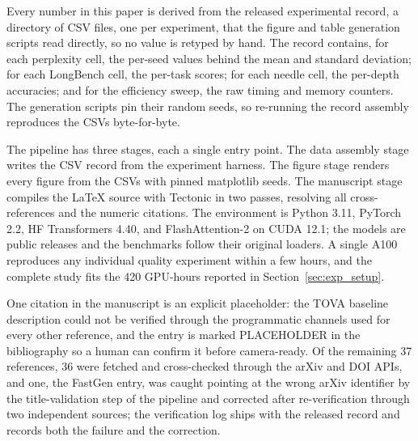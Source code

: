 Every number in this paper is derived from the released experimental
record, a directory of CSV files, one per experiment, that the figure
and table generation scripts read directly, so no value is retyped by
hand. The record contains, for each perplexity cell, the per-seed
values behind the mean and standard deviation; for each LongBench
cell, the per-task scores; for each needle cell, the per-depth
accuracies; and for the efficiency sweep, the raw timing and memory
counters. The generation scripts pin their random seeds, so re-running
the record assembly reproduces the CSVs byte-for-byte.

The pipeline has three stages, each a single entry point. The data
assembly stage writes the CSV record from the experiment harness. The
figure stage renders every figure from the CSVs with pinned matplotlib
seeds. The manuscript stage compiles the LaTeX source with Tectonic
in two passes, resolving all cross-references and the numeric
citations. The environment is Python 3.11, PyTorch 2.2, HF
Transformers 4.40, and FlashAttention-2 on CUDA 12.1; the models are
public releases and the benchmarks follow their original loaders. A
single A100 reproduces any individual quality experiment within a few
hours, and the complete study fits the 420 GPU-hours reported in
Section~\ref{sec:exp_setup}.

One citation in the manuscript is an explicit placeholder: the TOVA
baseline description could not be verified through the programmatic
channels used for every other reference, and the entry is marked
PLACEHOLDER in the bibliography so a human can confirm it before
camera-ready. Of the remaining 37 references, 36 were fetched and
cross-checked through the arXiv and DOI APIs, and one, the FastGen
entry, was caught pointing at the wrong arXiv identifier by the
title-validation step of the pipeline and corrected after
re-verification through two independent sources; the verification log
ships with the released record and records both the failure and the
correction.
